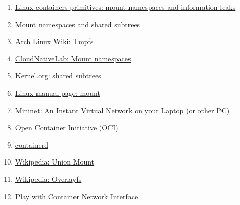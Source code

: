 \documentclass[a4paper, oneside, 12pt]{book}
\begin{document}
\begin{enumerate}
		\item
		\label{bib: mount namespace info 1}
		\href{https://www.schutzwerk.com/en/43/posts/namespaces_02_mnt/}{Linux containers primitives: mount namespaces and information leaks}
		
		\item
		\label{bib: mount namespace info 2}
		\href{https://lwn.net/Articles/689856/}{Mount namespaces and shared subtrees}
		
		\item
		\label{bib: tmpfs arch linux}
		\href{https://wiki.archlinux.org/title/Tmpfs}{Arch Linux Wiki: Tmpfs}
		
		\item
		\label{bib: mount namespaces containerlabs}
		\href{https://www.containerlabs.kubedaily.com/LXC/Linux%20Containers/Mount-namespaces.html}{CloudNativeLab: Mount namespaces}
		
		\item
		\label{bib: mount namespaces shared subtree}
		\href{https://www.kernel.org/doc/Documentation/filesystems/sharedsubtree.txt}{Kernel.org: shared subtrees}
		
		\item
		\label{bib: mount namespaces shared subtree 2}
		\href{https://man7.org/linux/man-pages/man8/mount.8.html}{Linux manual page: mount}
		
		\item
		\label{bib: mininet home page}
		\href{http://mininet.org/}{Mininet: An Instant Virtual Network on your Laptop (or other PC)}
		
		\item
		\label{bib: oci}
		\href{https://opencontainers.org/}{Open Container Initiative (OCI)}
		
		\item
		\label{bib: containerd}
		\href{https://containerd.io/}{containerd}
		
		\item
		\label{bib: union mount}
		\href{https://en.wikipedia.org/wiki/Union_mount}{Wikipedia: Union Mount}
		
		\item
		\label{bib: overlayfs}
		\href{https://en.wikipedia.org/wiki/OverlayFS}{Wikipedia: Overlayfs}
		
		\item
		\label{bib: docker y namespaces}
		\href{https://arthurchiao.art/blog/play-with-container-network-if/}{Play with Container Network Interface}
		

\end{enumerate}
\end{document}
